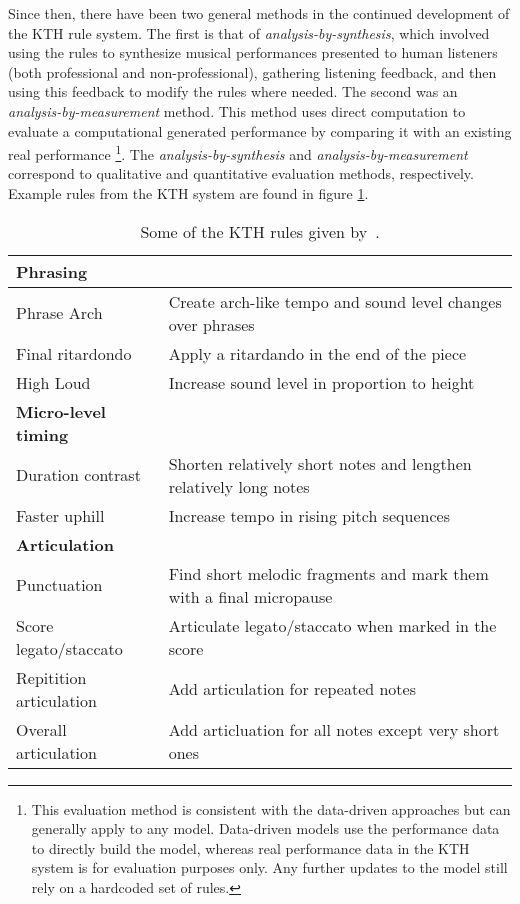 Since then, there have been two general methods in the continued development of the KTH rule system. The first is that of \emph{analysis-by-synthesis}, which involved using the rules to synthesize musical performances presented to human listeners (both professional and non-professional), gathering listening feedback, and then using this feedback to modify the rules where needed. The second was an \emph{analysis-by-measurement} method. This method uses direct computation to evaluate a computational generated performance by comparing it with an existing real performance%
\footnote{This evaluation method is consistent with the data-driven approaches but can generally apply to any model. Data-driven models use the performance data to directly build the model, whereas real performance data in the KTH system is for evaluation purposes only. Any further updates to the model still rely on a hardcoded set of rules.}. The \emph{analysis-by-synthesis} and \emph{analysis-by-measurement} correspond to qualitative and quantitative evaluation methods, respectively. Example rules from the KTH system are found in figure \ref{tab:kth-rules}.


\begin{table}
    \setlength{\extrarowheight}{7pt}
    \begin{center}
    \begin{tabular}{l | l }
        \textbf{Phrasing} & \\
        \hline
        Phrase Arch & Create arch-like tempo and sound level changes over phrases \\
        Final ritardondo & Apply a ritardando in the end of the piece \\
        High Loud & Increase sound level in proportion to height \\
        \textbf{Micro-level timing} & \\
        \hline
        Duration contrast & Shorten relatively short notes and lengthen relatively long notes \\ 
        Faster uphill & Increase tempo in rising pitch sequences \\
        \textbf{Articulation} & \\
        \hline
        Punctuation & Find short melodic fragments and mark them with a final micropause \\
        Score legato/staccato & Articulate legato/staccato when marked in the score \\
        Repitition articulation & Add articulation for repeated notes \\
        Overall articulation & Add articluation for all notes except very short ones 
    \end{tabular}
    \caption{Some of the KTH rules given by~\citet{friberg2006overview}.}
    \label{tab:kth-rules}
    \end{center}
\end{table}

